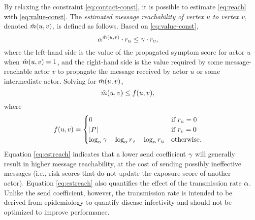 By relaxing the constraint \eqref{eq:contact-const}, it is possible to estimate \eqref{eq:reach} with \eqref{eq:value-const}. The \emph{estimated message reachability of vertex $u$ to vertex $v$}, denoted $\hat{m}(u, v)$, is defined as follows. Based on \eqref{eq:value-const},
%
\begin{equation*}
    \alpha^{\hat{m}(u, v)} \cdot r_u \leq \gamma \cdot r_v,
\end{equation*}
%
where the left-hand side is the value of the propagated symptom score for actor $u$ when $\hat{m}(u, v) = 1$, and the right-hand side is the value required by some message-reachable actor $v$ to propagate the message received by actor $u$ or some intermediate actor. Solving for $\hat{m}(u, v)$,
%
\begin{equation}\label{eq:estreach}
    \hat{m}(u, v) \leq f(u, v),
\end{equation}
%
where
%
\begin{equation*}
    f(u, v) = 
    \begin{cases} 
        0 & \text{if $r_u = 0$} \\
        \left\vert P \right\vert & \text{if $r_v = 0$} \\
        \log_{\alpha}\gamma + \log_{\alpha}r_v - \log_{\alpha}r_u & \text{otherwise.}
    \end{cases}
\end{equation*}
%
Equation \eqref{eq:estreach} indicates that a lower send coefficient $\gamma$ will generally result in higher message reachability, at the cost of sending possibly ineffective messages (i.e., risk scores that do not update the exposure score of another actor). Equation \eqref{eq:estreach} also quantifies the effect of the transmission rate $\alpha$. Unlike the send coefficient, however, the transmission rate is intended to be derived from epidemiology to quantify disease infectivity and should not be optimized to improve performance.


